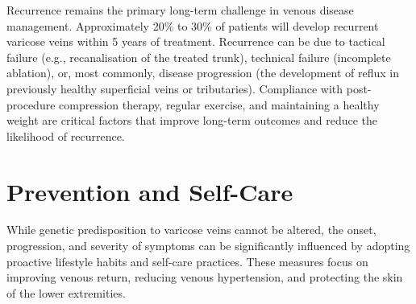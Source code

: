 Recurrence remains the primary long-term challenge in venous disease management. Approximately 20\% to 30\% of patients will develop recurrent varicose veins within 5 years of treatment. Recurrence can be due to tactical failure (e.g., recanalisation of the treated trunk), technical failure (incomplete ablation), or, most commonly, disease progression (the development of reflux in previously healthy superficial veins or tributaries). Compliance with post-procedure compression therapy, regular exercise, and maintaining a healthy weight are critical factors that improve long-term outcomes and reduce the likelihood of recurrence.

\section*{Prevention and Self-Care}
While genetic predisposition to varicose veins cannot be altered, the onset, progression, and severity of symptoms can be significantly influenced by adopting proactive lifestyle habits and self-care practices. These measures focus on improving venous return, reducing venous hypertension, and protecting the skin of the lower extremities.


